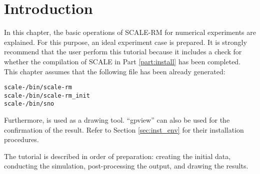 \section{Introduction} \label{sec:ideal_exp_intro}

In this chapter, the basic operations of SCALE-RM for numerical experiments are explained. For this purpose, an ideal experiment case is prepared. It is strongly recommend that the user perform this tutorial because it includes a check for whether the compilation of SCALE  in Part \ref{part:install} has been completed. This chapter assumes that the following file has been already generated:
\begin{alltt}
  scale-{\version}/bin/scale-rm
  scale-{\version}/bin/scale-rm_init
  scale-{\version}/bin/sno
\end{alltt}
Furthermore, \grads is used as a drawing tool. ``gpview'' can also be used for the confirmation of the result. Refer to Section \ref{sec:inst_env} for their installation procedures.

The tutorial is described in order of preparation: creating the initial data, conducting the simulation, post-processing the output, and drawing the results.


